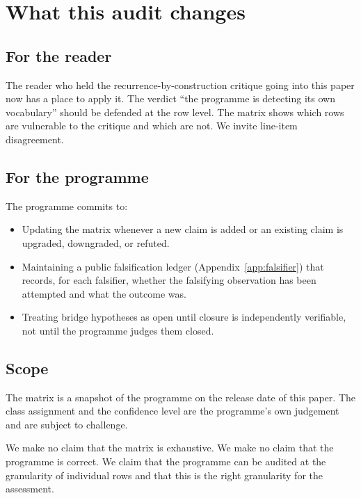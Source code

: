 \documentclass[11pt,a4paper]{article}
\begin{document}
\section{What this audit changes}
\label{sec:changes}

\subsection{For the reader}

The reader who held the recurrence-by-construction critique going
into this paper now has a place to apply it. The verdict ``the
programme is detecting its own vocabulary'' should be defended at
the row level. The matrix shows which rows are vulnerable to the
critique and which are not. We invite line-item disagreement.

\subsection{For the programme}

The programme commits to:

\begin{itemize}[leftmargin=*]
  \item Updating the matrix whenever a new claim is added or an
        existing claim is upgraded, downgraded, or refuted.
  \item Maintaining a public falsification ledger
        (Appendix~\ref{app:falsifier}) that records, for each
        falsifier, whether the falsifying observation has been
        attempted and what the outcome was.
  \item Treating bridge hypotheses as open until closure is
        independently verifiable, not until the programme judges
        them closed.
\end{itemize}

\subsection{Scope}

\begin{scopebox}
The matrix is a snapshot of the programme on the release date of
this paper. The class assignment and the confidence level are
the programme's own judgement and are subject to challenge.

We make no claim that the matrix is exhaustive. We make no claim
that the programme is correct. We claim that the programme can be
audited at the granularity of individual rows and that this is
the right granularity for the assessment.
\end{scopebox}
\end{document}
